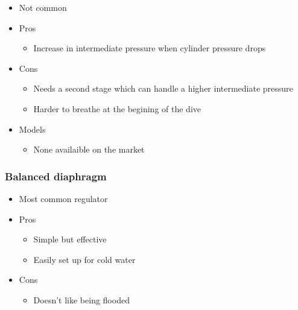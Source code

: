 \documentclass[aspectratio=1610,english,12pt]{beamer}
\begin{document}
\begin{frame}{\insertsubsubsection}
	\begin{itemize}
		\item Not common
		\item Pros
		\begin{itemize}
			\item Increase in intermediate pressure when cylinder pressure drops
		\end{itemize}
		\item Cons
		\begin{itemize}
			\item Needs a second stage which can handle a higher intermediate pressure
			\item Harder to breathe at the begining of the dive
		\end{itemize}
	\end{itemize}
\end{frame}

\begin{frame}{\insertsubsubsection}
	\begin{itemize}
		\item Models
		\begin{itemize}
			\item None availaible on the market
		\end{itemize}
	\end{itemize}
\end{frame}

\subsubsection{Balanced diaphragm}
\begin{frame}{\insertsubsubsection}
\end{frame}

\begin{frame}{\insertsubsubsection}
\end{frame}

\begin{frame}{\insertsubsubsection}
\end{frame}

\begin{frame}{\insertsubsubsection}
	\begin{itemize}
		\item Most common regulator
		\item Pros
		\begin{itemize}
			\item Simple but effective
			\item Easily set up for cold water
		\end{itemize}
		\item Cons
		\begin{itemize}
			\item Doesn't like being flooded
		\end{itemize}
	\end{itemize}
\end{frame}
\end{document}
